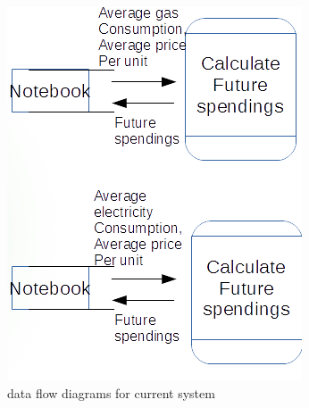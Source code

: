 \begin{figure}[H]
    \includegraphics[width=\textwidth]{./dataflowdiagrams2_5.png}
    \caption{data flow diagrams for current system} \label{fig:dataflowdiagrams}
\end{figure}

